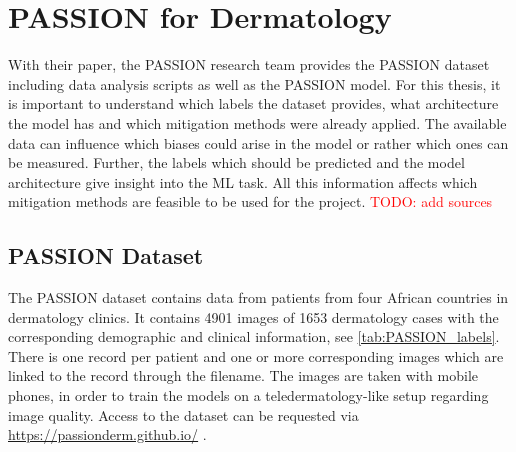 \documentclass[12pt, a4paper, oneside]{book}   	%
\renewcommand{\todo}[1]{\textcolor{red}{TODO: #1}}
\begin{document}
		
		\section{PASSION for Dermatology}
			With their paper, the PASSION research team provides the PASSION dataset including data analysis scripts as well as the PASSION model. For this thesis, it is important to understand which labels the dataset provides, what architecture the model has and which mitigation methods were already applied. The available data can influence which biases could arise in the model or rather which ones can be measured. Further, the labels which should be predicted and the model architecture give insight into the ML task. All this information affects which mitigation methods are feasible to be used for the project. \todo{add sources}
			
			\subsection{PASSION Dataset}
				The PASSION dataset contains data from patients from four African countries in dermatology clinics. It contains 4901 images of 1653 dermatology cases with the corresponding demographic and clinical information, see \autoref{tab:PASSION_labels}. There is one record per patient and one or more corresponding images which are linked to the record through the filename. The images are taken with mobile phones, in order to train the models on a \gls{teledermatology}-like setup regarding image quality. 
				Access to the dataset can be requested via \href{https://passionderm.github.io/}{https://passionderm.github.io/} \autocite{Gottfrois2024}.
				
\end{document}
